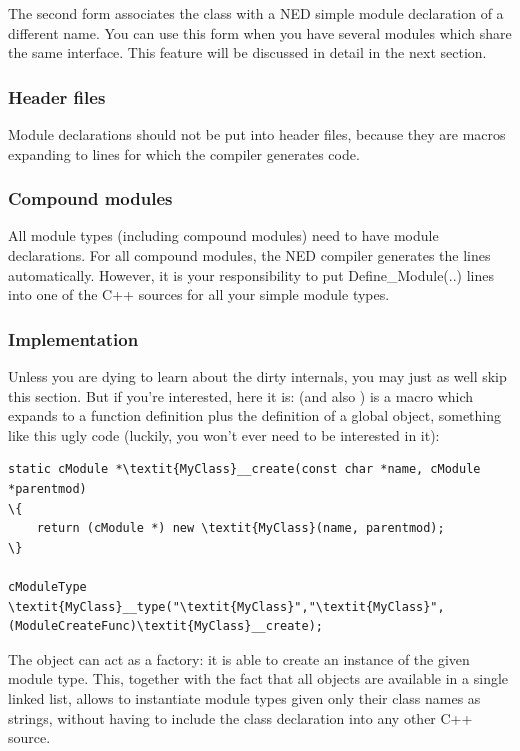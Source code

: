 The second form associates the class with a NED
simple module declaration of a different name.
You can use this form when you have several modules which share the
same interface. This feature will be discussed in detail in the next
section.


\subsubsection{Header files}


Module declarations should not be put into header files, because they are macros expanding to lines for which the
compiler generates code.


\subsubsection{Compound modules}

All module types (including compound modules)
need to have module declarations. For all
compound modules, the NED compiler generates the
 lines automatically.
However, it is your responsibility to put Define\_Module(..) lines into
one of the C++ sources for all your simple module types.


\subsubsection{Implementation}


Unless you are dying to learn about the dirty internals, you may just
as well skip this section. But if you're interested, here it is:
 (and also ) is a
macro which expands to a function definition plus the definition of a
global object, something like this ugly code (luckily, you won't ever
need to be interested in it):

\begin{Verbatim}[commandchars=\\\{\}]
static cModule *\textit{MyClass}__create(const char *name, cModule *parentmod)
\{
    return (cModule *) new \textit{MyClass}(name, parentmod);
\}

cModuleType \textit{MyClass}__type("\textit{MyClass}","\textit{MyClass}", (ModuleCreateFunc)\textit{MyClass}__create);
\end{Verbatim}


The  object can act as a factory: it is able to
create an instance of the given module type. This, together with the
fact that all  objects are available in a single
linked list, allows {\opp} to instantiate module types given only
their class names as strings, without having to include the class
declaration into any other C++ source.


